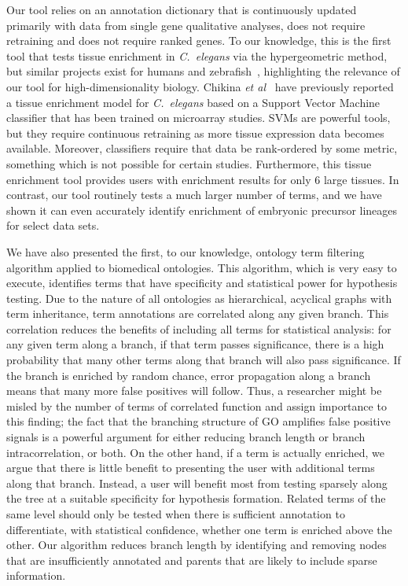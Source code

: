 Our tool relies on an annotation dictionary that is continuously updated
primarily with data from single gene qualitative analyses, does not require
retraining and does not require ranked genes. To our knowledge, this is the first
tool that tests tissue enrichment  in \emph{C.~elegans} via the hypergeometric
method, but similar projects exist for humans and zebrafish~\citep{Lee2013,
Prykhozhij2013}, highlighting the relevance of our tool for high-dimensionality
biology. Chikina \emph{et al}~\citep{Chikina2009} have previously reported a
tissue enrichment model for \emph{C.~elegans }based on a Support Vector Machine
classifier that has been trained on microarray studies. SVMs are powerful tools,
but they require continuous retraining as more tissue expression data becomes
available. Moreover, classifiers require that data be rank-ordered by some metric,
something which is not possible for certain studies. Furthermore, this tissue
enrichment tool provides users with enrichment results for only 6 large tissues.
In contrast, our tool routinely tests a much larger number of terms, and we have
shown it can even accurately identify enrichment of embryonic precursor lineages
for select data sets.

We have also presented the first, to our knowledge, ontology term filtering
algorithm applied to biomedical ontologies. This algorithm, which is very easy
to execute, identifies terms that have specificity and statistical power for
hypothesis testing. Due to the nature of all ontologies as hierarchical, acyclical
graphs with term inheritance, term annotations are correlated along any given
branch. This correlation reduces the benefits of including all terms for
statistical analysis: for any given term along a branch, if that term passes
significance, there is a high probability that many other terms along that branch
will also pass significance. If the branch is enriched by random chance, error
propagation along a branch means that many more false positives will follow.
Thus, a researcher might be misled by the number of terms of correlated function
and assign importance to this finding; the fact that the branching structure of
GO amplifies false positive signals is a powerful argument for either reducing
branch length or branch intracorrelation, or both. On the other hand, if a term
is actually enriched, we argue that there is little benefit to presenting the
user with additional terms along that branch. Instead, a user will benefit most
from testing sparsely along the tree at a suitable specificity for hypothesis
formation. Related terms of the same level should only be tested when there is
sufficient annotation to differentiate, with statistical confidence, whether one
term is enriched above the other. Our algorithm reduces branch length by
identifying and removing nodes that are insufficiently annotated and parents
that are likely to include sparse information.


